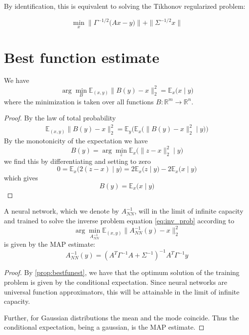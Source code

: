 \documentclass[a4paper,10pt]{article}
\begin{document}
	By identification, this is equivalent to solving the Tikhonov regularized problem:
	
	\[
		\min_x \| \Gamma^{-1/2} \bigl(Ax - y\bigr) \| + \|\Sigma^{-1/2} x\|
	\]
	
\section{Best function estimate}
\begin{theorem}[{\cite[\S\,1.5.5]{Bi2006}}]
\label{prop:bestfunest}
  We have
	\[
		\arg \min_{B} \mathbb{E}_{(x, y)} \|B(y) - x\|_2^2 = \mathbb{E}_{x}\bigl(x \mid y \bigr)
	\]
	where the minimization is taken over all functions $B \colon \mathbb{R}^m \to \mathbb{R}^n$.
\end{theorem} 

	\begin{proof} By the law of total probability
	\begin{align*}
		\mathbb{E}_{(x, y)} \|B(y) - x\|_2^2 = 
		\mathbb{E}_{y} \bigl(\mathbb{E}_{x}\bigl(\|B(y) - x\|_2^2 \mid y \bigr)\bigr)
	\end{align*}
	By the monotonicity of the expectation we have
	\[
		B(y) = \arg\min_{z} \mathbb{E}_{x}\bigl(\|z - x\|_2^2 \mid y \bigr)
	\]
	we find this by differentiating and setting to zero
	\[
	    0 =
	    \mathbb{E}_{x}\bigl(2 (z - x) \mid y \bigr) =
	    2\mathbb{E}_{x}\bigl(z \mid y \bigr) - 2\mathbb{E}_{x}\bigl(x \mid y \bigr)
	\]
	which gives
	\[
		B(y) = \mathbb{E}_{x}\bigl(x \mid y \bigr)
	\]
\end{proof} 

	\begin{theorem} A neural network, which we denote by $A^{-1}_{NN}$, will in the limit of infinite capacity and trained to solve the inverse problem equation \ref{eq:inv_prob} according to
	\[
		\arg \min_{A^{-1}_{NN}} \mathbb{E}_{(x, y)} \|A^{-1}_{NN}(y) - x\|_2^2
	\]
	is given by the MAP estimate:
	\[
		A^{-1}_{NN}(y) = (A^T \Gamma^{-1} A + \Sigma^{-1})^{-1} A^T \Gamma^{-1} y
	\]
\end{theorem}

	\begin{proof} By \autoref{prop:bestfunest}, we have that the optimum solution of the training problem is given by the conditional expectation. Since neural networks are universal function approximators, this will be attainable in the limit of infinite capacity.
	
	Further, for Gaussian distributions the mean and the mode coincide. Thus the conditional expectation, being a gaussian, is the MAP estimate.
\end{proof}
\end{document}
